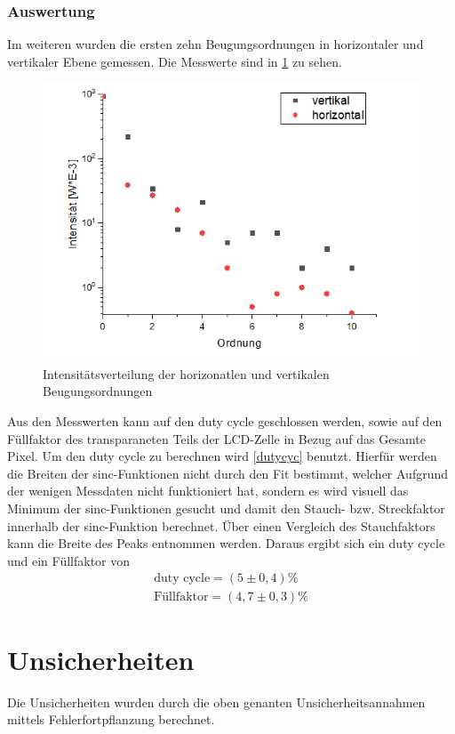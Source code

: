 \subsubsection{Auswertung}
Im weiteren wurden die ersten zehn Beugungsordnungen in horizontaler und vertikaler Ebene gemessen. Die Messwerte sind in \cref{horiz} zu sehen.
\begin{figure}[h!]
	\centering
	\includegraphics[scale = 1]{horizundvertik.png}
	\caption{Intensitätsverteilung der horizonatlen und vertikalen Beugungsordnungen}
	\label{horiz}
\end{figure}
Aus den Messwerten kann auf den duty cycle geschlossen werden, sowie auf den Füllfaktor des transparaneten Teils der LCD-Zelle in Bezug auf das Gesamte Pixel. Um den duty cycle zu berechnen wird \cref{dutycyc} benutzt. Hierfür werden die Breiten der sinc-Funktionen nicht durch den Fit bestimmt, welcher Aufgrund der wenigen Messdaten nicht funktioniert hat, sondern es wird visuell das Minimum der sinc-Funktionen gesucht und damit den Stauch- bzw. Streckfaktor innerhalb der sinc-Funktion berechnet. Über einen Vergleich des Stauchfaktors kann die Breite des Peaks entnommen werden.
Daraus ergibt sich ein duty cycle und ein Füllfaktor von 
\begin{align}
	\text{duty cycle} = (5 \pm 0,4)\% \\
	\text{Füllfaktor} = (4,7 \pm 0,3)\%
\end{align}
\section{Unsicherheiten}
Die Unsicherheiten wurden durch die oben genanten Unsicherheitsannahmen mittels Fehlerfortpflanzung berechnet.
